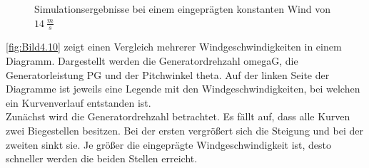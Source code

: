 \begin{figure}[H]
   \centering
   \caption[Simulationsergebnisse schneller konstanter Wind]{Simulationsergebnisse bei einem eingeprägten konstanten Wind von $\SI{14}{\frac{m}{s}}$}
   \label{fig:Bild4.9}
\end{figure}

\autoref{fig:Bild4.10} zeigt einen Vergleich mehrerer Windgeschwindigkeiten in einem Diagramm. Dargestellt werden die Generatordrehzahl \acs{omegaG}, die Generatorleistung \acs{PG} und der Pitchwinkel \acs{theta}. Auf der linken Seite der Diagramme ist jeweils eine Legende mit den Windgeschwindigkeiten, bei welchen ein Kurvenverlauf entstanden ist.\\
Zunächst wird die Generatordrehzahl betrachtet. Es fällt auf, dass alle Kurven zwei Biegestellen besitzen. Bei der ersten vergrößert sich die Steigung und bei der zweiten sinkt sie. Je größer die eingeprägte Windgeschwindigkeit ist, desto schneller werden die beiden Stellen erreicht. 

